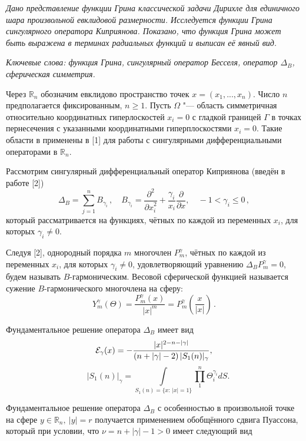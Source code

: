 

\vzmscaption

\textit{Дано представление функции Грина классической задачи Дирихле для единичного шара произвольной евклидовой размерности. Исследуется функции Грина сингулярного оператора Киприянова. Показано, что функция Грина может быть выражена в терминах радиальных функций и выписан её явный вид.}

\textit{Ключевые слова: функция Грина, сингулярный оператор Бесселя, оператор $\Delta_B$, сферическая симметрия.}

\medskip
Через $\mathbb{R}_n$ обозначим евклидово пространство точек 
$x=(x_1,...,x_n)$. Число $n$ предполагается фиксированным, $n\geqslant 1$. Пусть $\Omega$ "--- область симметричная относительно координатных гиперлоскостей $x_i=0$
с гладкой границей $\Gamma$ в точках пернесечения с указанными координатными гиперплоскостями $x_i=0$.  Такие области в применены в [1] для работы с сингулярными дифференциальными операторами в  
$\mathbb{R}_n$. 

Рассмотрим сингулярный дифференциальный оператор Киприянова (введён в работе [2])
$$
\Delta_B = {\sum\limits_{j=1}^n B_{\gamma_i}}\,,\quad 
B_{\gamma_i}=\frac{\partial^2}{{\partial x}_i^2}+\frac{\gamma_i}{x_i}\frac{\partial}{\partial x}, \quad
-1<\gamma_i\leqslant0\,,
$$
который рассматривается на функциях, чётных по каждой из переменных $x_i$, для которых $\gamma_i\neq0$.


Следуя [2], однородный порядка $m$ многочлен $P_{m}^{\gamma}$, чётных по каждой из переменных $x_i$, для которых $\gamma_i\neq0$, удовлетворяющий уравнению $\Delta_B {P_{m}^{\gamma}}=0$, будем  называть $B$-гармоническим.
Весовой сферической функцией называется сужение $B$-гармонического многочлена на сферу:
$$
Y_{m}^{\gamma}(\Theta) = \frac{P_{m}^{\gamma}(x)}{|x|^m} = P_{m}^{\gamma}\left({\frac{x}{|x|}}\right)\,.
$$
 
Фундаментальное решение оператора $\Delta_B$ имеет вид
$$
{\cal E}_{\gamma}{(x)}=-\frac{|x|^{2-n-|\gamma|}}
{(n+|\gamma|-2)\,|S_1(n)|_\gamma},
$$
$$
\quad
|S_1(n)|_\gamma=\int\limits_{S_1(n)=\{x:\,|x|=1\}}
\prod\limits_1^n\Theta_i^{\gamma_i} dS.
$$

Фундаментальное решение оператора $\Delta_B$ с особенностью в произвольной точке на сфере $y\in\mathbb{R}_n,~|y|=r$ получается применением обобщённого сдвига Пуассона, который  при условии, что $\nu{=}n{+}|\gamma|{-}1{>}0$ имеет следующий вид 



